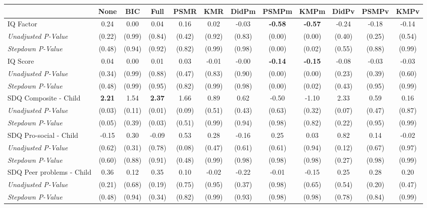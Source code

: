 \begin{tabular}{l c c c c c c c c c c c}
\toprule
 & None & BIC & Full & PSMR & KMR & DidPm & PSMPm & KMPm & DidPv & PSMPv & KMPv \\
\midrule
IQ Factor & 0.24 & 0.00 & 0.04 & 0.16 & 0.02 & -0.03 & \textbf{ -0.58 } & \textbf{ -0.57 } & -0.24 & -0.18 & -0.14 \\
\quad \textit{Unadjusted P-Value} & (0.22) & (0.99) & (0.84) & (0.42) & (0.92) & (0.83) & (0.00) & (0.00) & (0.40) & (0.25) & (0.54) \\
\quad \textit{Stepdown P-Value} & (0.48) & (0.94) & (0.92) & (0.82) & (0.99) & (0.98) & (0.00) & (0.02) & (0.55) & (0.88) & (0.99) \\
IQ Score & 0.04 & 0.00 & 0.01 & 0.03 & -0.01 & -0.00 & \textbf{ -0.14 } & \textbf{ -0.15 } & -0.08 & -0.03 & -0.03 \\
\quad \textit{Unadjusted P-Value} & (0.34) & (0.99) & (0.88) & (0.47) & (0.83) & (0.90) & (0.00) & (0.00) & (0.23) & (0.39) & (0.60) \\
\quad \textit{Stepdown P-Value} & (0.48) & (0.99) & (0.95) & (0.82) & (0.99) & (0.98) & (0.00) & (0.02) & (0.43) & (0.95) & (0.99) \\
SDQ Composite - Child & \textbf{ 2.21 } & 1.54 & \textbf{ 2.37 } & 1.66 & 0.89 & 0.62 & -0.50 & -1.10 & 2.33 & 0.59 & 0.16 \\
\quad \textit{Unadjusted P-Value} & (0.03) & (0.11) & (0.01) & (0.09) & (0.51) & (0.43) & (0.63) & (0.32) & (0.07) & (0.47) & (0.87) \\
\quad \textit{Stepdown P-Value} & (0.05) & (0.39) & (0.03) & (0.51) & (0.99) & (0.94) & (0.98) & (0.82) & (0.22) & (0.95) & (0.99) \\
SDQ Pro-social - Child & -0.15 & 0.30 & -0.09 & 0.53 & 0.28 & -0.16 & 0.25 & 0.03 & 0.82 & 0.14 & -0.02 \\
\quad \textit{Unadjusted P-Value} & (0.62) & (0.31) & (0.78) & (0.08) & (0.47) & (0.61) & (0.61) & (0.94) & (0.12) & (0.67) & (0.97) \\
\quad \textit{Stepdown P-Value} & (0.60) & (0.88) & (0.91) & (0.48) & (0.99) & (0.98) & (0.98) & (0.98) & (0.27) & (0.98) & (0.99) \\
SDQ Peer problems - Child & 0.36 & 0.12 & 0.35 & 0.10 & -0.02 & -0.22 & -0.01 & -0.15 & 0.25 & 0.28 & 0.20 \\
\quad \textit{Unadjusted P-Value} & (0.21) & (0.68) & (0.19) & (0.75) & (0.95) & (0.37) & (0.98) & (0.65) & (0.54) & (0.20) & (0.47) \\
\quad \textit{Stepdown P-Value} & (0.48) & (0.94) & (0.34) & (0.82) & (0.99) & (0.93) & (0.98) & (0.98) & (0.78) & (0.84) & (0.99) \\

\end{tabular}
